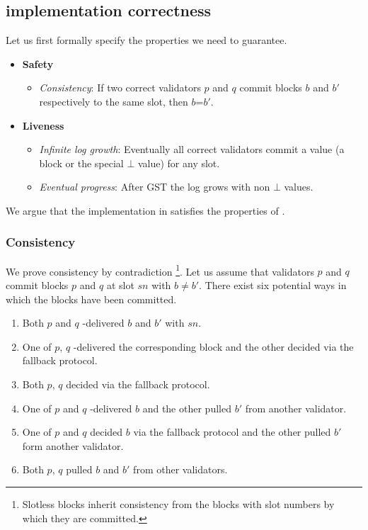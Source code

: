 \subsection{\system implementation correctness}
\label{sec:log-correctness}

Let us first formally specify the properties we need \system to guarantee.

\begin{itemize}
	\item \textbf{Safety}
	\begin{itemize}
	\item \textit{Consistency}: If two correct validators $p$ and $q$ commit blocks $b$ and $b'$ respectively to the same slot, then $b$=$b'$.
	\end{itemize}
	\item \textbf{Liveness}
	\begin{itemize}
	\item \textit{Infinite log growth}: Eventually all correct validators commit a value (a block or the special $\bot$ value) for any slot.
	\item \textit{Eventual progress}: After GST the log grows with non $\bot$ values.
	\end{itemize}
\end{itemize}

We argue that the implementation in  satisfies the properties of \system.

\subsubsection{Consistency}
\label{sec:consistency}
We prove consistency by contradiction%
\footnote{Slotless blocks inherit consistency from the blocks with slot numbers by which they are committed.}.
Let us assume that validators $p$ and $q$ commit blocks $p$ and $q$ at slot $sn$ with $b\neq b'$.
There exist six potential ways in which the blocks have been committed.
\begin{enumerate}
	\item Both $p$ and $q$ \primitivesmall-delivered $b$ and $b'$ with $sn$.
	\item One of $p$, $q$ \primitivesmall-delivered the corresponding block and the other decided via the fallback protocol.
	\item Both $p$, $q$ decided via the fallback protocol.
	\item One of $p$ and $q$ \primitivesmall-delivered $b$ and the other pulled $b'$ from another validator.
	\item One of $p$ and $q$ decided $b$ via the fallback protocol and the other pulled $b'$ form another validator.
	\item Both $p$, $q$ pulled $b$ and $b'$ from other validators.
\end{enumerate}

